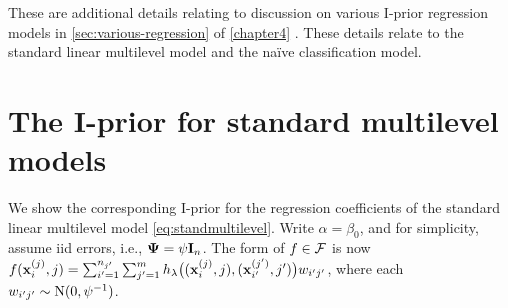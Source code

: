 These are additional details relating to discussion on various I-prior regression models in \cref{sec:various-regression} of \cref{chapter4} .
These details relate to the standard linear multilevel model and the naïve classification model.

\section{The I-prior for standard multilevel models}
\label{misc:multilevelmodels}

We show the corresponding I-prior for the regression coefficients of the standard linear multilevel model \cref{eq:standmultilevel}.
Write $\alpha=\beta_0$, and for simplicity, assume iid errors, i.e.,  ${\bm\Psi} = \psi{\mathbf I}_n$.
The form of $f\in{\mathcal F}$ is now $f({\mathbf x}_i^{(j)},j) = \sum_{i'=1}^{n_{j'}}\sum_{j'=1}^m h_\lambda\big(({\mathbf x}_i^{(j)},j),({\mathbf x}_{i'}^{(j')},j')\big) w_{i'j'}$, where each $w_{i'j'}\sim\operatorname{N}(0,\psi^{-1})$.

